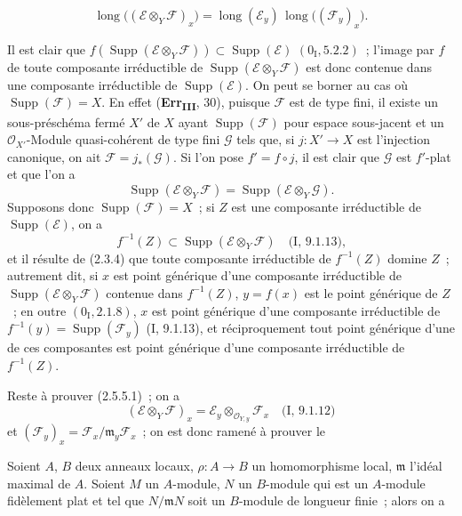 \begin{env}[2.5.5.1]
\label{IV.2.5.5.1-fr}
\[
\operatorname{long}\bigl((\mathscr E\otimes_Y\mathscr F)_x\bigr)
=\operatorname{long}(\mathscr E_y)\,
 \operatorname{long}\bigl((\mathscr F_y)_x\bigr).
\]
\end{env}

Il est clair que
$f(\operatorname{Supp}(\mathscr E\otimes_Y\mathscr F))
\subset\operatorname{Supp}(\mathscr E)$ $(0_{\mathrm I},5.2.2)$~; l'image
par $f$ de toute composante irréductible de
$\operatorname{Supp}(\mathscr E\otimes_Y\mathscr F)$ est donc contenue dans
une composante irréductible de $\operatorname{Supp}(\mathscr E)$. On peut se
borner au cas où $\operatorname{Supp}(\mathscr F)=X$. En effet
(\textbf{Err}\textsubscript{\textbf{III}}, 30), puisque $\mathscr F$ est de
type fini, il existe un sous-préschéma fermé $X'$ de $X$ ayant
$\operatorname{Supp}(\mathscr F)$ pour espace sous-jacent et un
$\mathcal O_{X'}$-Module quasi-cohérent de type fini $\mathscr G$ tels que,
si $j:X'\to X$ est l'injection canonique, on ait
$\mathscr F=j_*(\mathscr G)$. Si l'on pose $f'=f\circ j$, il est clair que
$\mathscr G$ est $f'$-plat et que l'on a
\[
\operatorname{Supp}(\mathscr E\otimes_Y\mathscr F)
=\operatorname{Supp}(\mathscr E\otimes_Y\mathscr G).
\]
Supposons donc $\operatorname{Supp}(\mathscr F)=X$~; si $Z$ est une
composante irréductible de $\operatorname{Supp}(\mathscr E)$, on a
\[
f^{-1}(Z)\subset\operatorname{Supp}(\mathscr E\otimes_Y\mathscr F)
\quad\text{(I, 9.1.13),}
\]
et il résulte de (2.3.4) que toute composante irréductible de $f^{-1}(Z)$
domine $Z$~; autrement dit, si $x$ est point générique d'une composante
irréductible de $\operatorname{Supp}(\mathscr E\otimes_Y\mathscr F)$
contenue dans $f^{-1}(Z)$, $y=f(x)$ est le point générique de $Z$~; en outre
$(0_{\mathrm I},2.1.8)$, $x$ est point générique d'une composante
irréductible de
$f^{-1}(y)=\operatorname{Supp}(\mathscr F_y)$ (I, 9.1.13), et
réciproquement tout point générique d'une de ces composantes est point
générique d'une composante irréductible de $f^{-1}(Z)$.

Reste à prouver (2.5.5.1)~; on a
\[
(\mathscr E\otimes_Y\mathscr F)_x
=\mathscr E_y\otimes_{\mathcal O_{Y,y}}\mathscr F_x
\quad\text{(I, 9.1.12)}
\]
et
$(\mathscr F_y)_x=\mathscr F_x/\mathfrak m_y\mathscr F_x$~; on est donc
ramené à prouver le

\begin{lemma}[2.5.5.2]
\label{IV.2.5.5.2-fr}
Soient $A$, $B$ deux anneaux locaux, $\rho:A\to B$ un homomorphisme local,
$\mathfrak m$ l'idéal maximal de $A$. Soient $M$ un $A$-module, $N$ un
$B$-module qui est un $A$-module fidèlement plat et tel que
$N/\mathfrak mN$ soit un $B$-module de longueur finie~; alors on a
\end{lemma}

